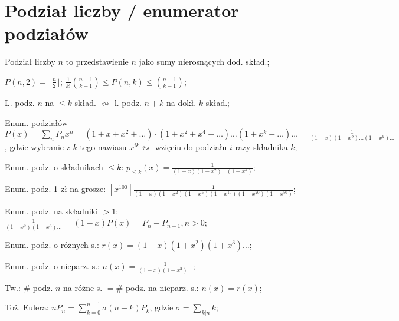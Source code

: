 \section{Podział liczby / enumerator podziałów}

\entry
Podział liczby $n$ to przedstawienie $n$ jako sumy nierosnących dod. skład.;

\entry
$P(n, 2) = \lfloor\frac{n}{2}\rfloor$;
\entry
$\frac{1}{k!}\binom{n-1}{k-1} \leq P(n,k) \leq \binom{n-1}{k-1}$;

\entry
L. podz. $n$ na $\leq k$ skład. $\leftrightsquigarrow$
  l. podz. $n+k$ na dokł. $k$ skład.;

\entry
Enum. podziałów $P(x) = \sum_nP_nx^n =
  (1+x+x^2+\dots)\cdot(1+x^2+x^4+\dots)\dots(1+x^k+\dots)\dots =
  \frac{1}{(1-x)(1-x^2)\dots(1-x^k)\dots}$, gdzie wybranie z $k$-tego nawiasu
  $x^{ik} \leftrightsquigarrow$ wzięciu do podziału $i$ razy składnika $k$;

\entry
Enum. podz. o składnikach $\leq k$: $p_{\leq k} (x) =
  \frac{1}{(1-x)(1-x^2)\dots(1-x^k)}$;

\entry
Enum. podz. 1 zł na grosze:
  $\left [ x^{100} \right ]
  \frac{1}{(1-x)(1-x^2)(1-x^5)(1-x^{10})(1-x^{20})(1-x^{50})}$;

\entry
Enum. podz. na składniki $>1$: $\frac{1}{(1-x^2)(1-x^3)\dots}=(1-x)P(x) =
  P_n - P_{n-1}, n>0$;

\entry
Enum. podz. o różnych s.: $r(x) = (1+x)(1+x^2)(1+x^3)\dots$;

\entry
Enum. podz. o nieparz. s.: $n(x)=\frac{1}{(1-x)(1-x^3)\dots}$;

\entry
Tw.: $\#$ podz. $n$ na różne s. $= \#$ podz. na nieparz. s.: $n(x) = r(x)$;

\entry
Toż. Eulera: $nP_n = \sum_{k=0}^{n-1}\sigma(n-k)P_k$,
  gdzie $\sigma = \sum_{k|n}k$;
